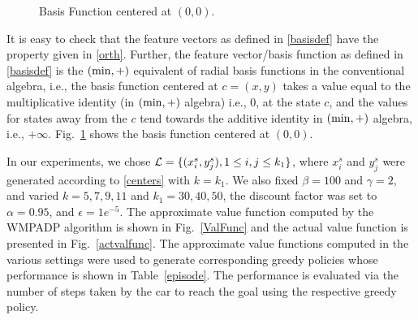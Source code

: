 \FloatBarrier
\begin{figure}[H]
\caption{Basis Function centered at $(0,0)$.}
\label{basisf}
\end{figure}
It is easy to check that the feature vectors as defined in \eqref{basisdef} have the property given in \eqref{orth}. Further, the feature vector/basis function as defined in \eqref{basisdef} is the $(\min,+)$ equivalent of radial basis functions in the conventional algebra, i.e., the basis function centered at $c=(x,y)$ takes a value equal to the multiplicative identity (in $(\min,+)$ algebra) i.e., $0$, at the state $c$, and the values for states away from the $c$ tend towards the additive identity in $(\min,+)$ algebra, i.e., $+\infty$. Fig.~\ref{basisf} shows the basis function centered at $(0,0)$.\\
\begin{comment}
\begin{figure}
\label{mcar}

\caption{Mountain Car}
\end{figure}
\end{comment}

In our experiments, we chose $\mathcal{L}=\{(x_i^s,y_j^s), 1\leq i,j \leq k_1\}$, where $x_i^s$ and $y_j^s$ were generated according to \eqref{centers} with $k=k_1$. We also fixed $\beta=100$ and $\gamma=2$, and varied $k=5, 7, 9, 11$ and $k_1=30,40,50$, the discount factor was set to $\alpha=0.95$, and $\epsilon=1e^{-5}$. The approximate value function computed by the WMPADP algorithm is shown in Fig.~\ref{ValFunc} and the actual value function is presented in Fig.~\ref{actvalfunc}. The approximate value functions computed in the various settings were used to generate corresponding greedy policies whose performance is shown in Table~\ref{episode}. The performance is evaluated via the number of steps taken by the car to reach the goal using the respective greedy policy.
